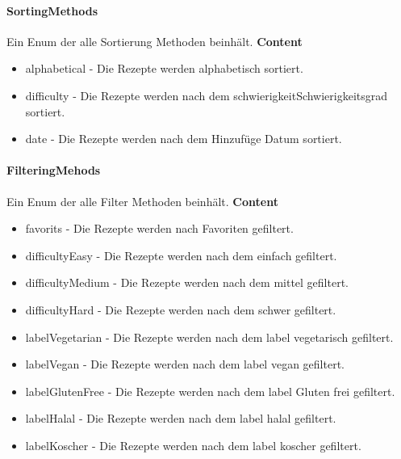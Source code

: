 \documentclass[parskip=full]{scrartcl}
\begin{document}
        \paragraph{SortingMethods}
        Ein Enum der alle Sortierung Methoden beinhält.
            \textbf{Content}
            \begin{itemize}
                \item  alphabetical - Die Rezepte werden alphabetisch sortiert.
                \item  difficulty - Die Rezepte werden nach dem \gls{schwierigkeit}{Schwierigkeitsgrad} sortiert.
                \item  date - Die Rezepte werden nach dem Hinzufüge Datum sortiert.
            \end{itemize}
            
        \paragraph{FilteringMehods}
        Ein Enum der alle Filter Methoden beinhält.
            \textbf{Content}
            \begin{itemize}
                \item favorits - Die Rezepte werden nach Favoriten gefiltert.
                \item difficultyEasy - Die Rezepte werden nach dem  einfach gefiltert.
                \item difficultyMedium - Die Rezepte werden nach dem  mittel gefiltert.
                \item difficultyHard - Die Rezepte werden nach dem  schwer gefiltert.
                \item labelVegetarian - Die Rezepte werden nach dem \gls{label} vegetarisch gefiltert.
                \item labelVegan - Die Rezepte werden nach dem \gls{label} vegan gefiltert.
                \item labelGlutenFree - Die Rezepte werden nach dem \gls{label} Gluten frei gefiltert.
                \item labelHalal - Die Rezepte werden nach dem \gls{label} halal gefiltert.
                \item labelKoscher - Die Rezepte werden nach dem \gls{label} koscher gefiltert.
            \end{itemize}
            
\end{document}
